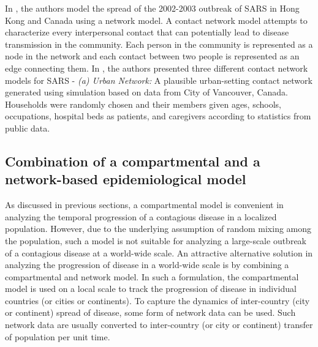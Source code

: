 \documentclass[10pt, journal,onecolumn]{IEEEtran}
\begin{document}
In \citep{meyers2005network}, the authors model the spread of the 2002-2003 outbreak of SARS in Hong
Kong and Canada using a network model. A contact network model attempts to characterize every
interpersonal contact that can potentially lead to disease transmission in the community. Each
person in the community is represented as a node in the network and each contact between two people
is represented as an edge connecting them. In \citep{meyers2005network}, the authors presented three
different contact network models for SARS -  \textit{(a) Urban Network:} A plausible urban-setting
contact network generated using simulation based on data from City of Vancouver, Canada. Households
were randomly chosen and  their members given ages, schools, occupations, hospital beds as patients,
and  caregivers according to statistics from public data.

%
%
%


\subsection{{Combination of a compartmental and a network-based epidemiological model}}

As discussed in previous sections, a compartmental model is convenient in analyzing the temporal
progression of a contagious disease in a localized population. However, due to the underlying
assumption of random mixing among the population, such a model is not suitable for analyzing a large-scale
outbreak of a contagious disease at a world-wide scale. An attractive alternative solution in
analyzing the progression of disease in a world-wide scale is by combining a compartmental and
network model. In such a formulation, the compartmental model is used on a local scale to track the
progression of disease in individual countries (or cities or continents). To capture the dynamics of
inter-country (city or continent) spread of disease, some form of network data can be used. Such
network data are usually converted to inter-country (or city or continent) transfer of population per
unit time.
\end{document}
